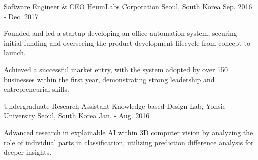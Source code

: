 \begin{cventries}
\cventry
{Software Engineer \& CEO} %
{HeumLabs Corporation} %
{Seoul, South Korea} %
{Sep. 2016 - Dec. 2017} %
{ %
\begin{cvitems}
    \item Founded and led a startup developing an office automation system, securing initial funding and overseeing the product development lifecycle from concept to launch.
    \item Achieved a successful market entry, with the system adopted by over 150 businesses within the first year, demonstrating strong leadership and entrepreneurial skills.
\end{cvitems}
}

\cventry
{Undergraduate Research Assistant} %
{Knowledge-based Design Lab, Yonsie University} %
{Seoul, South Korea} %
{Jan. - Aug. 2016} %
{ %
\begin{cvitems}
\item Advanced research in explainable AI within 3D computer vision by analyzing the role of individual parts in classification, utilizing prediction difference analysis for deeper insights.
\end{cvitems}
}



\end{cventries}
